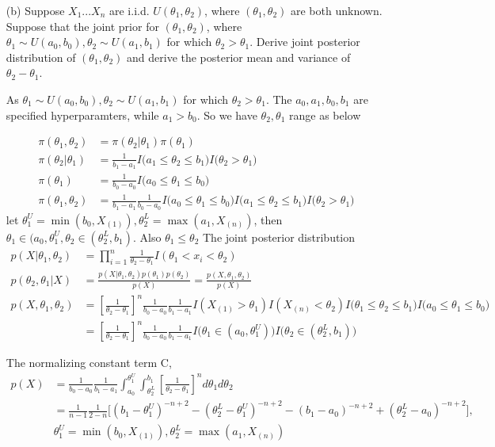 \begin{itemize}
\item[(b)] Suppose $X_1...X_n$ are i.i.d. $U(\theta_{1}, \theta_{2})$, where $(\theta_{1}, \theta_{2})$ are both unknown. Suppose that the joint prior for $(\theta_{1}, \theta_{2})$, where $\theta_1 \sim U(a_0, b_0), \theta_2 \sim U(a_1, b_1)$ for which $\theta_2 > \theta_1$. Derive joint posterior distribution of $(\theta_1, \theta_2)$ and derive the posterior mean and variance of $\theta_2 - \theta_1$.

As $\theta_1 \sim U(a_0, b_0), \theta_2 \sim U(a_1, b_1)$ for which $\theta_2 > \theta_1$. The $a_0, a_1, b_0, b_1$ are specified hyperparamters, while $a_1 > b_0$. 
So we have $\theta_2, \theta_1$ range as below 

\begin{align*}
	\pi(\theta_1, \theta_2) &= \pi(\theta_2|\theta_1) \pi(\theta_1) \\
	\pi(\theta_2| \theta_1) &= \frac{1}{b_1 - a_1} I \Big(  a_1 \leq \theta_2 \leq b_1 \Big) I \Big(   \theta_2 > \theta_1 \Big) \\
	\pi(\theta_1) &= \frac{1}{b_0 - a_0} I \Big( a_0 \leq \theta_1 \leq b_0 \Big) \\
	\pi(\theta_1, \theta_2) &= \frac{1}{b_1 - a_1} \frac{1}{b_0 - a_0} I \Big( a_0 \leq \theta_1 \leq b_0 \Big) I \Big(  a_1 \leq \theta_2 \leq b_1 \Big) I \Big(   \theta_2 > \theta_1 \Big)
\end{align*}	
let $ \theta_{1}^{U} = \min(b_0, X_{(1)}), \theta_{2}^{L} = \max(a_1, X_{(n)})$, then $\theta_1 \in (a_0, \theta_{1}^{U} , \theta_2 \in (\theta_{2}^{L}, b_1)$. Also $\theta_1 \leq \theta_2 $
The joint posterior distribution
\begin{align*}
	p(X|\theta_1, \theta_2) &= \prod_{i=1}^n \frac{1}{\theta_2-\theta_1} I(\theta_1 < x_i < \theta_2)\\
	p(\theta_2, \theta_1|X) &= \frac{p(X|\theta_1, \theta_2) p(\theta_1) p(\theta_2)}{p(X)} = \frac{p(X, \theta_1, \theta_2) }{p(X)} \\
	p(X, \theta_1, \theta_2) &= [\frac{1}{\theta_2-\theta_1}]^n \frac{1}{b_0-a_0} \frac{1}{b_1- a_1} I(X_{(1)} > \theta_1) I(X_{(n)} < \theta_2) I \Big(  \theta_1 \leq \theta_2 \leq b_1 \Big) I \Big(  a_0 \leq \theta_1 \leq b_0 \Big)  \\
	&= [\frac{1}{\theta_2-\theta_1}]^n \frac{1}{b_0-a_0} \frac{1}{b_1- a_1}  I \Big(\theta_1 \in (a_0, \theta_{1}^{U} ) \Big) I \Big(\theta_2 \in (\theta_{2}^{L}, b_1)\Big) 
\end{align*}	

The normalizing constant term C,
\begin{align*}
	p(X) &=\frac{1}{b_0-a_0} \frac{1}{b_1- a_1} \int_{a_0}^{\theta_{1}^{U}} \int_{\theta_{2}^{L}}^{b_1} [\frac{1}{\theta_2-\theta_1}]^n  d\theta_1 d\theta_2  \\
	& = \frac{1}{n-1} \frac{1}{2-n} \Big[ (b_1 - \theta_1^{U})^{-n+2} - (\theta_{2}^{L} - \theta_1^{U})^{-n+2} - (b_1 - a_0)^{-n+2} + (\theta_{2}^{L} - a_0)^{-n+2} \Big],\\
	& \theta_{1}^{U} = \min(b_0, X_{(1)}), \theta_{2}^{L} = \max(a_1, X_{(n)})
\end{align*}	


\end{itemize}
